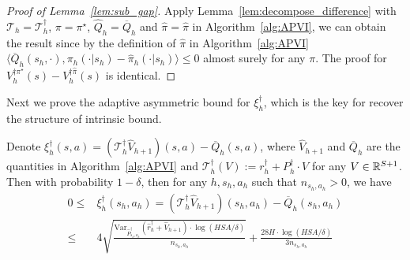 \begin{proof}[Proof of Lemma~\ref{lem:sub_gap}]
Apply Lemma~\ref{lem:decompose_difference} with $\mathcal{T}_h=\mathcal{T}^\dagger_h$, $\pi=\pi^\star$, $\widehat{Q}_h=\overline{Q}_h$ and $\widehat{\pi}=\widehat{\pi}$ in Algorithm~\ref{alg:APVI}, we can obtain the result since by the definition of $\widehat{\pi}$ in Algorithm~\ref{alg:APVI} $\langle\overline{Q}_{h}\left(s_{h}, \cdot\right), \pi_{h}\left(\cdot | s_{h}\right)-\widehat{\pi}_{h}\left(\cdot | s_{h}\right)\rangle\leq 0$ almost surely for any $\pi$. The proof for $V_h^{\dagger\pi^\star}(s)-V_h^{\dagger\widehat{\pi}}(s)$ is identical.
\end{proof}

Next we prove the adaptive asymmetric bound for $\xi^\dagger_h$, which is the key for recover the structure of intrinsic bound.

\begin{lemma}\label{lem:bellman_diff_tight}
	Denote $\xi^\dagger_h(s,a)=(\mathcal{T}^\dagger_h\widehat{V}_{h+1})(s,a)-\overline{Q}_h(s,a)$, where $\widehat{V}_{h+1}$ and  $\overline{Q}_h$ are the quantities in Algorithm~\ref{alg:APVI} and $\mathcal{T}^\dagger_h(V):=r^\dagger_h+P^\dagger_h\cdot V$ for any $V\in\mathbb{R}^{S+1}$. Then with probability $1-\delta$, then for any $h,s_h,a_h$ such that $n_{s_h,a_h}>0$, we have 
	\begin{align*}
	0\leq &\xi^\dagger_h(s_h,a_h)=(\mathcal{T}^\dagger_h\widehat{V}_{h+1})(s_h,a_h)-\overline{Q}_h(s_h,a_h)\\
	\leq &4\sqrt{\frac{\mathrm{Var}_{\widehat{P}^\dagger_{s_h,a_h}}(\widehat{r}^\dagger_h+\widehat{V}_{h+1})\cdot\log(HSA/\delta)}{n_{s_h,a_h}}}+\frac{28H\cdot\log(HSA/\delta)}{3n_{s_h,a_h}}
	\end{align*}
\end{lemma}

